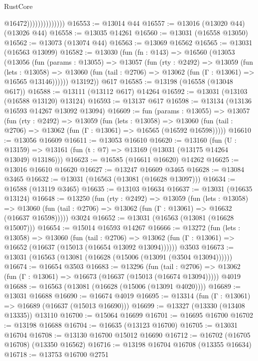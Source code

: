 \begin{lexlean}{RustCore}
\begin{coremodule}
                                @16472))))))))))))))
@16553 := @13014 @44
@16557 := @13016 (@13020 @44) (@13026 @44)
@16558 := @13035 @14261
@16560 := @13031 (@16558 @13050)
@16562 := @13073 (@13074 @44)
@16563 := @13069 @16562
@16565 := @13031 (@16563 @13099)
@16582 := @13030
    (fun (fn : @143) =>
    @16560
      (@13053
        (@13056
          (fun (params : @13055) =>
          @13057
            (fun (rty : @2492) =>
            @13059
              (fun (lets : @13058) =>
              @13060 (fun (tail : @2706) => @13062 (fun (Γ : @13061) => @16565 @13146))))))
        @13192))
    @617
@16585 := @13198 (@16558 (@13048 @617))
@16588 := @13111 (@13112 @617) @14264
@16592 := @13031 (@13103 (@16588 @13120) @13124)
@16593 := @13137 @617
@16598 := @13134 (@13136 @16593 @14267 @13092 @13094)
@16609 := fun (params : @13055) =>
  @13057
    (fun (rty : @2492) =>
    @13059
      (fun (lets : @13058) =>
      @13060 (fun (tail : @2706) => @13062 (fun (Γ : @13061) => @16565 (@16592 @16598)))))
@16610 := @13056 @16609
@16611 := @13053 @16610
@16620 := @13160
    (fun (U : @13159) => @13161 (fun (t : @7) => @13169 (@13031 (@13175 @14264 @13049) @13186)))
@16623 := @16585 (@16611 @16620) @14262
@16625 := @13016 @16610 @16620
@16627 := @13247 @16609 @3465
@16628 := @13084 @3465
@16632 := @13031 (@16563 (@13081 (@16628 @13097)))
@16634 := @16588 (@13119 @3465)
@16635 := @13103 @16634
@16637 := @13031 (@16635 @13124)
@16648 := @13250
    (fun (rty : @2492) =>
    @13059
      (fun (lets : @13058) =>
      @13060 (fun (tail : @2706) => @13062 (fun (Γ : @13061) => @16632 (@16637 @16598)))))
    @3024
@16652 := @13031 (@16563 (@13081 (@16628 @15007)))
@16654 := @15014 @16593 @14267
@16666 := @13272
    (fun (lets : @13058) =>
    @13060
      (fun (tail : @2706) =>
      @13062 (fun (Γ : @13061) => @16652 (@16637 (@15013 (@16654 @13092 @13094))))))
    @3503
@16673 := @13031 (@16563 (@13081 (@16628 (@15006 (@13091 (@3504 @13094))))))
@16674 := @16654 @3503
@16683 := @13296
    (fun (tail : @2706) => @13062 (fun (Γ : @13061) => @16673 (@16637 (@15013 (@16674 @13094)))))
    @4019
@16688 := @16563 (@13081 (@16628 (@15006 (@13091 @4020))))
@16689 := @13031 @16688
@16690 := @16674 @4019
@16695 := @13314 (fun (Γ : @13061) => @16689 (@16637 (@15013 @16690)))
@16699 := @13327 (@13330 (@13408 @13335)) @13110
@16700 := @15064 @16699
@16701 := @16695 @16700
@16702 := @13198 @16688
@16704 := @16635 (@13123 @16700)
@16705 := @13031 @16704
@16708 := @13130 @16700 @15012 @16690
@16712 := @16702 (@16705 @16708) (@13350 @16562)
@16716 := @13198 @16704 @16708 (@13355 @16634)
@16718 := @13753 @16700 @2751

\end{coremodule}
\end{lexlean}
